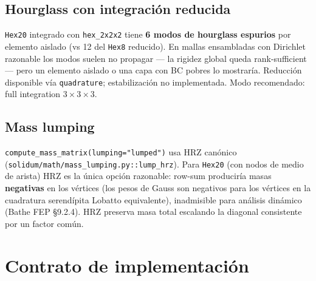 \documentclass[11pt,letterpaper,oneside]{report}
\begin{document}
\subsection{Hourglass con integración reducida}

\texttt{Hex20} integrado con \texttt{hex\_2x2x2} tiene \textbf{6 modos de hourglass espurios} por elemento aislado (vs 12 del \texttt{Hex8} reducido). En mallas ensambladas con Dirichlet razonable los modos suelen no propagar --- la rigidez global queda rank-sufficient --- pero un elemento aislado o una capa con BC pobres lo mostraría. Reducción disponible vía \texttt{quadrature}; estabilización no implementada. Modo recomendado: full integration $3\times 3\times 3$.

\subsection{Mass lumping}

\texttt{compute\_mass\_matrix(lumping="lumped")} usa HRZ canónico (\texttt{solidum/math/mass\_lumping.py::lump\_hrz}). Para \texttt{Hex20} (con nodos de medio de arista) HRZ es la única opción razonable: row-sum produciría masas \textbf{negativas} en los vértices (los pesos de Gauss son negativos para los vértices en la cuadratura serendípita Lobatto equivalente), inadmisible para análisis dinámico (Bathe FEP §9.2.4). HRZ preserva masa total escalando la diagonal consistente por un factor común.


\section{Contrato de implementación}
\end{document}
